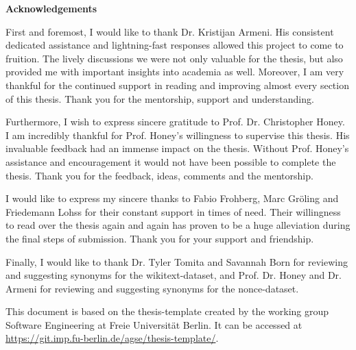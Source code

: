 \begin{center}\textbf{\small Acknowledgements}\end{center}

First and foremost, I would like to thank Dr. Kristijan Armeni.
His consistent dedicated assistance and lightning-fast responses allowed this project to come to fruition.
The lively discussions we were not only valuable for the thesis, but also provided me with important insights into academia as well.
Moreover, I am very thankful for the continued support in reading and improving almost every section of this thesis.
Thank you for the mentorship, support and understanding.

Furthermore, I wish to express sincere gratitude to Prof. Dr. Christopher Honey.
I am incredibly thankful for Prof. Honey's willingness to supervise this thesis.
His invaluable feedback had an immense impact on the thesis.
Without Prof. Honey's assistance and encouragement it would not have been possible to complete the thesis.
Thank you for the feedback, ideas, comments and the mentorship.

I would like to express my sincere thanks to Fabio Frohberg, Marc Gröling and Friedemann Lohss for their constant support in times of need.
Their willingness to read over the thesis again and again has proven to be a huge alleviation during the final steps of submission.
Thank you for your support and friendship.

Finally, I would like to thank Dr. Tyler Tomita and Savannah Born for reviewing and suggesting synonyms for the wikitext-dataset, and Prof. Dr. Honey and Dr. Armeni for reviewing and suggesting synonyms for the nonce-dataset.

This document is based on the thesis-template created by the working group Software Engineering at Freie Universität Berlin. It can be accessed at \url{https://git.imp.fu-berlin.de/agse/thesis-template/}.
